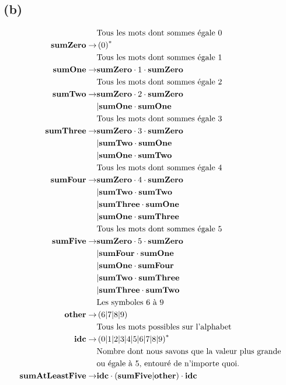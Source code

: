\documentclass[class=article]{standalone}
\begin{document}
\subsection*{(b)}
\begin{align*}
    &\text{Tous les mots dont sommes égale 0}\\
    {\bf{sumZero}} \rightarrow&
        \left ( 0 \right )^*\\
    &\text{Tous les mots dont sommes égale 1}\\
    {\bf{sumOne}} \rightarrow&
        {\bf{sumZero}}\cdot 1 \cdot{\bf{sumZero}}\\
    &\text{Tous les mots dont sommes égale 2}\\
    {\bf{sumTwo}} \rightarrow&
        {\bf{sumZero}}\cdot 2 \cdot{\bf{sumZero}}\\&
        |{\bf{sumOne}}\cdot{\bf{sumOne}} \\
    &\text{Tous les mots dont sommes égale 3}\\
    {\bf{sumThree}} \rightarrow&
        {\bf{sumZero}}\cdot 3 \cdot{\bf{sumZero}}\\&
        |{\bf{sumTwo}}\cdot{\bf{sumOne}}\\&
        |{\bf{sumOne}}\cdot{\bf{sumTwo}} \\
    &\text{Tous les mots dont sommes égale 4}\\
    {\bf{sumFour}} \rightarrow& 
        {\bf{sumZero}}\cdot 4 \cdot{\bf{sumZero}} \\&
        |{\bf{sumTwo}}\cdot{\bf{sumTwo}}\\&
        |{\bf{sumThree}}\cdot{\bf{sumOne}}\\&
        |{\bf{sumOne}}\cdot{\bf{sumThree}}\\
    &\text{Tous les mots dont sommes égale 5}\\
    {\bf{sumFive}} \rightarrow& 
        {\bf{sumZero}}\cdot 5 \cdot{\bf{sumZero}} \\&
        |{\bf{sumFour}}\cdot {\bf{sumOne}}\\&
        |{\bf{sumOne}}\cdot {\bf{sumFour}}\\&
        |{\bf{sumTwo}}\cdot {\bf{sumThree}}\\&
        |{\bf{sumThree}}\cdot {\bf{sumTwo}}\\
    &\text{Les symboles 6 à 9 }\\
    {\bf{other}} \rightarrow& 
        \left ( 6|7|8|9 \right )\\
    &\text{Tous les mots possibles sur l'alphabet}\\
    {\bf{idc}} \rightarrow& 
        \left ( 0|1|2|3|4|5|6|7|8|9 \right )^*\\
    &\text{Nombre dont nous savons que la valeur plus grande}\\
    &\text{ou égale à 5, entouré de n'importe quoi.}\\
    {\bf{sumAtLeastFive}} \rightarrow& 
        {\bf{idc}}\cdot\left ( {\bf{sumFive}}|{\bf{other}} \right )\cdot{\bf{idc}}\\&
\end{align*}
\end{document}
